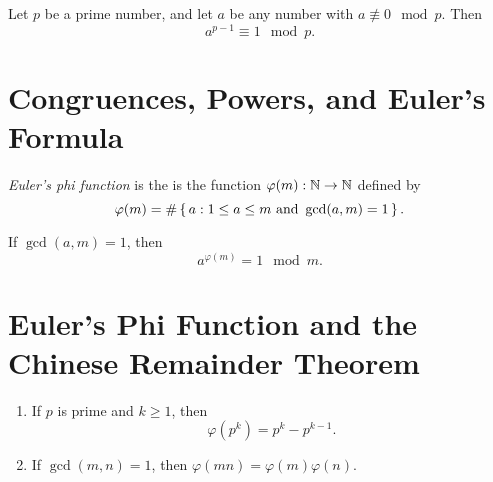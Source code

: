 \documentclass[10pt]{article}
\begin{document}
\begin{theorem}[\textcolor{red}{Fermat's Little Theorem}] Let $p$ be a prime number, and let $a$ be any number with $a \not\equiv 0 \mod{p}$. Then
    \[a^{p-1} \equiv 1 \mod{p}.\]
\end{theorem}

\begin{comment}
\setcounter{lemma}{1}
\begin{lemma}Let $p$ be a prime number and let $a$ be a number with $a \neq 0\mod{p}$. Then the numbers
    \[a,2a,3a,\ldots,(p-1)a \mod{p}\]
    are the same as the numbers
    \[1,2,3,\ldots,(p-1) \mod{p},\]
    although they may be in a different order.
\end{lemma}
\end{comment}

\section{Congruences, Powers, and Euler's Formula}

\begin{definition*}[\textcolor{red}{Euler Phi Function}]\emph{Euler's phi function} is the is the function $\varphi(m):\mathbb{N} \to \mathbb{N}$ defined by
    \[\varphi(m)=\# \set{a : 1 \leq a \leq m \ \textnormal{and} \ \gcd(a,m)=1}.\]
\end{definition*}

\begin{theorem}[\textcolor{red}{Euler's Formula}] If $\gcd(a,m)=1$, then
    \[a^{\varphi(m)}=1 \mod{m}.\]
\end{theorem}

\begin{comment}
\setcounter{lemma}{1}
\begin{lemma} If $\gcd(a,m)=1$, then the numbers
    \[b_1a,b_2a,b_3a,\ldots,b_{\varphi(m)}a \mod{m}\]
    are the same as the numbers
    \[b_1,b_2,b_3,\ldots,b_{\varphi(m)} \mod{m}\]
    although they may be in a different order.
\end{lemma}
\end{comment}

\section{Euler's Phi Function and the Chinese Remainder Theorem}


\begin{theorem}[\textcolor{red}{Phi Function Formulas}]
    \begin{enumerate}[label=(\alph*)]
        \item If $p$ is prime and $k \geq 1$, then
            \[\varphi\left(p^k \right)=p^k - p^{k-1}.\]
        \item If $\gcd(m,n)=1$, then $\varphi(mn)=\varphi(m)\varphi(n)$.
    \end{enumerate}
\end{theorem}
\end{document}
